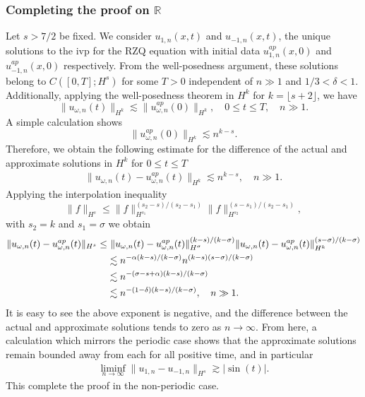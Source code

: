 \documentclass[reqno]{amsart}
\theoremstyle{plain}
\numberwithin{equation}{section}
\begin{document}
 
 \subsubsection{Completing the proof on $\mathbb R$} 
 Let $s > 7/2$ be fixed. We consider $u_{1, n}(x,t) $ and $u_{-1, n}(x,t) $, the unique solutions to the ivp for the RZQ equation with initial data $u^{ap} _{1, n} (x,0) $ and  $u^{ap} _{-1, n} (x,0) $ respectively. From the well-posedness argument, these solutions belong to $C([0, T]; H^s)$ for some  $T>0$ independent of $n\gg1 $ and $1/3<\delta <1$. 
 Additionally, applying the well-posedness theorem in $H^k$ for $k = \lfloor s+2 \rfloor$, we have 
 $$
 \| u_{\omega, n} (t) \|_{H^k } \lesssim  \| u_{\omega, n} ^{ap} (0) \|_{H^k } , \quad 0\le t \le T , \quad n\gg1.  
 $$
 A simple calculation shows 
  $$
  \| u_{\omega, n} ^{ap} (0) \|_{H^k }  \lesssim  n^{k-s} .  
 $$
 Therefore, we obtain the following estimate for the difference of the actual and approximate solutions in $H^k$ for $0\le t \le T$ 
 \begin{align}
  \| u_{\omega, n} (t) - u_{\omega, n}^{ap}  (t)  \|_{H^k } \lesssim n^{k-s} , \quad n\gg1 . 
 \end{align}
 Applying the interpolation inequality
 $$
 \|f\|_{H^s} \le \|f\|_{H^{s_1}} ^{(s_2-s)/(s_2-s_1) }  \|f\|_{H^{s_2}}^{(s-s_1)/(s_2-s_1) } ,
 $$
 with $s_2 = k$ and $s_1 = \sigma$ we obtain 
  \begin{align}
  \| u_{\omega, n} (t) - u_{\omega, n}^{ap}  (t)  \|_{H^s } \le  & \   \| u_{\omega, n} (t) - u_{\omega, n}^{ap}  (t)  \|_{H^\sigma }   ^{(k-s)/( k-\sigma) }   \| u_{\omega, n} (t) - u_{\omega, n}^{ap}  (t)  \|_{H^k }^{(s-\sigma)/( k-\sigma) }   
  \notag \\
  & \lesssim  n^{-\alpha(k-s)/( k-\sigma) } n^{(k-s) (s-\sigma )/( k-\sigma) }
  \notag  \\
   & \lesssim    n^{-(\sigma -s+ \alpha)(k-s)/( k-\sigma) } 
 \notag   \\
   & \lesssim    n^{-(1-\delta)(k-s)/( k-\sigma) } , \quad n\gg1.
 \end{align}
 It is easy to see the above exponent is negative, and the difference between the actual and approximate solutions tends to zero as $n\rightarrow \infty$. 
 From here, a calculation which mirrors the periodic case shows that the approximate solutions remain bounded away from each for all positive time, and in particular 
\begin{align}
\liminf_{n\rightarrow\infty} \| u_{1,n} - u_{-1,n} \| _{H^s}  \gtrsim |\sin(t)| .
\end{align}
This complete the proof in the non-periodic case. 
\end{document}
